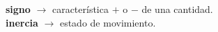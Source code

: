 \begin{defcard}
    \textbf{signo}    $\rightarrow$  característica $+$ o $-$ de una cantidad. \\
    \textbf{inercia}  $\rightarrow$ estado de movimiento.\\
\end{defcard}